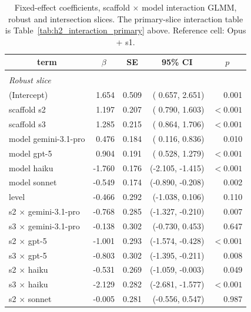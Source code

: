 \documentclass[10pt]{article} %
\begin{document}
    \begin{table}[h]
        \caption{Fixed-effect coefficients, scaffold $\times$ model interaction GLMM, robust and intersection slices. The primary-slice interaction table is Table~\ref{tab:h2_interaction_primary} above. Reference cell: Opus + s1.}
    \label{tab:glmm_interaction_robust_intersection}
    \begin{center}
    \footnotesize
    \begin{tabular}{lrrrr}
        \multicolumn{1}{c}{\bf term} & \multicolumn{1}{c}{\bf $\beta$} & \multicolumn{1}{c}{\bf SE} & \multicolumn{1}{c}{\bf 95\% CI} & \multicolumn{1}{c}{\bf $p$} \\
        \hline \\
        \multicolumn{5}{l}{\textit{Robust slice}} \\
        (Intercept)                &  1.654 & 0.509 & ( 0.657,  2.651) & 0.001 \\
        scaffold s2                &  1.197 & 0.207 & ( 0.790,  1.603) & $<0.001$ \\
        scaffold s3                &  1.285 & 0.215 & ( 0.864,  1.706) & $<0.001$ \\
        model gemini-3.1-pro       &  0.476 & 0.184 & ( 0.116,  0.836) & 0.010 \\
        model gpt-5                &  0.904 & 0.191 & ( 0.528,  1.279) & $<0.001$ \\
        model haiku                & -1.760 & 0.176 & (-2.105, -1.415) & $<0.001$ \\
        model sonnet               & -0.549 & 0.174 & (-0.890, -0.208) & 0.002 \\
        level                      & -0.466 & 0.292 & (-1.038,  0.106) & 0.110 \\
        s2 $\times$ gemini-3.1-pro & -0.768 & 0.285 & (-1.327, -0.210) & 0.007 \\
        s3 $\times$ gemini-3.1-pro & -0.138 & 0.302 & (-0.730,  0.453) & 0.647 \\
        s2 $\times$ gpt-5          & -1.001 & 0.293 & (-1.574, -0.428) & $<0.001$ \\
        s3 $\times$ gpt-5          & -0.803 & 0.302 & (-1.395, -0.211) & 0.008 \\
        s2 $\times$ haiku          & -0.531 & 0.269 & (-1.059, -0.003) & 0.049 \\
        s3 $\times$ haiku          & -2.129 & 0.282 & (-2.681, -1.577) & $<0.001$ \\
        s2 $\times$ sonnet         & -0.005 & 0.281 & (-0.556,  0.547) & 0.987 \\

\end{tabular}
\end{center}
\end{table}
\end{document}
